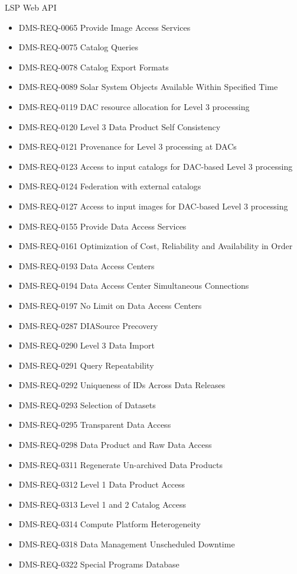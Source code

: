LSP Web API \begin{itemize}
\item DMS-REQ-0065 Provide Image Access Services
\item DMS-REQ-0075 Catalog Queries
\item DMS-REQ-0078 Catalog Export Formats
\item DMS-REQ-0089 Solar System Objects Available Within Specified Time
\item DMS-REQ-0119 DAC resource allocation for Level 3 processing
\item DMS-REQ-0120 Level 3 Data Product Self Consistency
\item DMS-REQ-0121 Provenance for Level 3 processing at DACs
\item DMS-REQ-0123 Access to input catalogs for DAC-based Level 3 processing
\item DMS-REQ-0124 Federation with external catalogs
\item DMS-REQ-0127 Access to input images for DAC-based Level 3 processing
\item DMS-REQ-0155 Provide Data Access Services
\item DMS-REQ-0161 Optimization of Cost, Reliability and Availability in Order
\item DMS-REQ-0193 Data Access Centers
\item DMS-REQ-0194 Data Access Center Simultaneous Connections
\item DMS-REQ-0197 No Limit on Data Access Centers
\item DMS-REQ-0287 DIASource Precovery
\item DMS-REQ-0290 Level 3 Data Import
\item DMS-REQ-0291 Query Repeatability
\item DMS-REQ-0292 Uniqueness of IDs Across Data Releases
\item DMS-REQ-0293 Selection of Datasets
\item DMS-REQ-0295 Transparent Data Access
\item DMS-REQ-0298 Data Product and Raw Data Access
\item DMS-REQ-0311 Regenerate Un-archived Data Products
\item DMS-REQ-0312 Level 1 Data Product Access
\item DMS-REQ-0313 Level 1 and 2 Catalog Access
\item DMS-REQ-0314 Compute Platform Heterogeneity
\item DMS-REQ-0318 Data Management Unscheduled Downtime
\item DMS-REQ-0322 Special Programs Database

\end{itemize}

